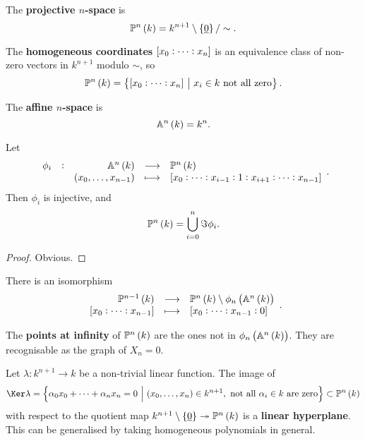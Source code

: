 \begin{definition}
The \textbf{projective $ n $-space} is
$$ \PP^n\br{k} = k^{n + 1} \setminus \cbr{\underline{0}} / \sim. $$
\end{definition}

\begin{notation}
The \textbf{homogeneous coordinates} $ \sbr{x_0 : \dots : x_n} $ is an equivalence class of non-zero vectors in $ k^{n + 1} $ modulo $ \sim $, so
$$ \PP^n\br{k} = \cbr{\sbr{x_0 : \dots : x_n} \st x_i \in k \ \text{not all zero}}. $$
\end{notation}

\pagebreak

\begin{definition}
The \textbf{affine $ n $-space} is
$$ \AA^n\br{k} = k^n. $$
\end{definition}

\begin{lemma}
Let
$$ \function[\phi_i]{\AA^n\br{k}}{\PP^n\br{k}}{\br{x_0, \dots, x_{n - 1}}}{\sbr{x_0 : \dots : x_{i - 1} : 1 : x_{i + 1} : \dots : x_{n - 1}}}. $$
Then $ \phi_i $ is injective, and
$$ \PP^n\br{k} = \bigcup_{i = 0}^n \Im \phi_i. $$
\end{lemma}

\begin{proof}
Obvious.
\end{proof}

\begin{exercise}
There is an isomorphism
$$ \function{\PP^{n - 1}\br{k}}{\PP^n\br{k} \setminus \phi_n\br{\AA^n\br{k}}}{\sbr{x_0 : \dots : x_{n - 1}}}{\sbr{x_0 : \dots : x_{n - 1} : 0}}. $$
\end{exercise}

\begin{definition}
The \textbf{points at infinity} of $ \PP^n\br{k} $ are the ones not in $ \phi_n\br{\AA^n\br{k}} $. They are recognisable as the graph of $ X_n = 0 $.
\end{definition}


Let $ \lambda : k^{n + 1} \to k $ be a non-trivial linear function. The image of
$$ \Ker \lambda = \cbr{\alpha_0x_0 + \dots + \alpha_nx_n = 0 \st \br{x_0, \dots, x_n} \in k^{n + 1}, \ \text{not all} \ \alpha_i \in k \ \text{are zero}} \subset \PP^n\br{k} $$
with respect to the quotient map $ k^{n + 1} \setminus \cbr{\underline{0}} \twoheadrightarrow \PP^n\br{k} $ is a \textbf{linear hyperplane}. This can be generalised by taking homogeneous polynomials in general.

